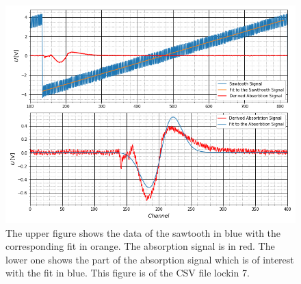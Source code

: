 	\begin{figure}[ht]
		\includegraphics[scale=0.5]{Bild/LockIn7.png}
		\centering
		\caption[Plots and Fits of Lock-In Method 7]{\small The upper figure shows the data of the sawtooth in blue with the corresponding fit in orange. The absorption signal is in red. The lower one shows the part of the absorption signal which is of interest with the fit in blue. This figure is of the CSV file lockin 7.}
		\label{Lock7}
	\end{figure}

